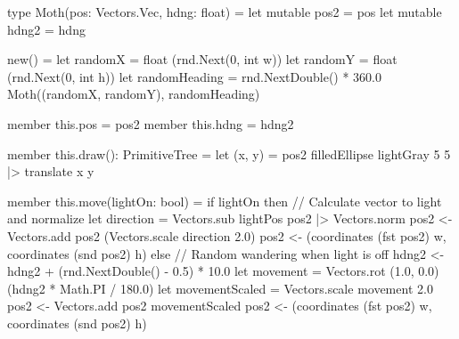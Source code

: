 
type Moth(pos: Vectors.Vec, hdng: float) =
    let mutable pos2 = pos
    let mutable hdng2 = hdng

    new() =
        let randomX = float (rnd.Next(0, int w))
        let randomY = float (rnd.Next(0, int h))
        let randomHeading = rnd.NextDouble() * 360.0
        Moth((randomX, randomY), randomHeading)

    member this.pos = pos2
    member this.hdng = hdng2

    member this.draw(): PrimitiveTree =
        let (x, y) = pos2
        filledEllipse lightGray 5 5
        |> translate x y


    member this.move(lightOn: bool) =
        if lightOn then
            // Calculate vector to light and normalize
            let direction = Vectors.sub lightPos pos2 |> Vectors.norm
            pos2 <- Vectors.add pos2 (Vectors.scale direction 2.0)
            pos2 <- (coordinates (fst pos2) w, coordinates (snd pos2) h)
        else
            // Random wandering when light is off
            hdng2 <- hdng2 + (rnd.NextDouble() - 0.5) * 10.0
            let movement = Vectors.rot (1.0, 0.0) (hdng2 * Math.PI / 180.0)
            let movementScaled = Vectors.scale movement 2.0
            pos2 <- Vectors.add pos2 movementScaled
            pos2 <- (coordinates (fst pos2) w, coordinates (snd pos2) h)

